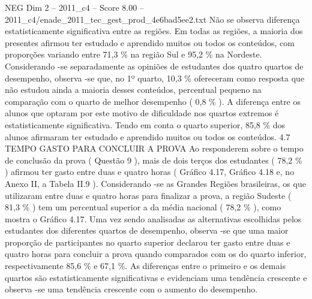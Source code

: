 \begin{textsample}{NEG Dim 2 – 2011\_c4 – Score 8.00 – 2011\_c4/enade\_2011\_tec\_gest\_prod\_4e6bad5ee2.txt}
Não se observa diferença estatisticamente significativa entre as regiões.
Em todas as regiões, a maioria dos presentes afirmou ter estudado e aprendido muitos ou todos os conteúdos, com proporções variando entre 71,3 \% na região Sul e 95,2 \% na Nordeste.
Considerando -se separadamente as opiniões de estudantes dos quatro quartos de desempenho, observa -se que, no 1º quarto, 10,3 \% ofereceram como resposta que não estudou ainda a maioria desses conteúdos, percentual pequeno na comparação com o quarto de melhor desempenho ( 0,8 \% ).
A diferença entre os alunos que optaram por este motivo de dificuldade nos quartos extremos é estatisticamente significativa.
Tendo em conta o quarto superior, 85,8 \% dos alunos afirmaram ter estudado e aprendido muitos ou todos os conteúdos. 4.7 TEMPO GASTO PARA CONCLUIR A PROVA Ao responderem sobre o tempo de conclusão da prova ( Questão 9 ), mais de dois terços dos estudantes ( 78,2 \% ) afirmou ter gasto entre duas e quatro horas ( Gráfico 4.17, Gráfico 4.18 e, no Anexo II, a Tabela II.9 ).
Considerando -se as Grandes Regiões brasileiras, os que utilizaram entre duas e quatro horas para finalizar a prova, a região Sudeste ( 81,3 \% ) tem um percentual superior a da média nacional ( 78,2 \% ), como mostra o Gráfico 4.17.
Uma vez sendo analisadas as alternativas escolhidas pelos estudantes dos diferentes quartos de desempenho, observa -se que uma maior proporção de participantes no quarto superior declarou ter gasto entre duas e quatro horas para concluir a prova quando comparados com os do quarto inferior, respectivamente 85,6 \% e 67,1 \%.
As diferenças entre o primeiro e os demais quartos são estatisticamente significativas e evidenciam uma tendência crescente e observa -se uma tendência crescente com o aumento do desempenho.

\end{textsample}
